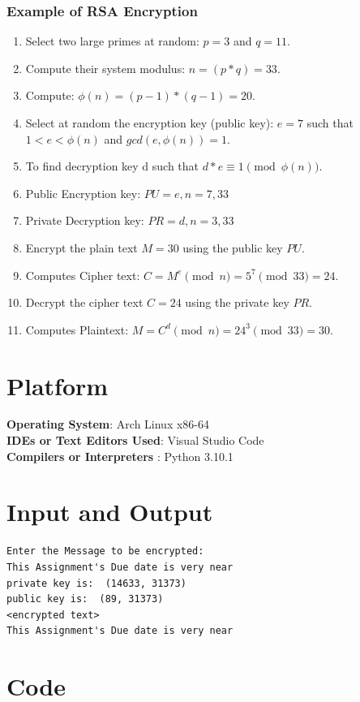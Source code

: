 \documentclass[openany]{book}
\begin{document}
\subsubsection{Example of RSA Encryption}
\begin{enumerate}
	\item Select two large primes at random: $p = 3$ and $q = 11$.
	\item Compute their system modulus: $n = (p*q) = 33$.
	\item Compute: $\phi(n) = (p-1)*(q-1) = 20$.
	\item Select at random the encryption key (public key): $e = 7$ such that $1 < e < \phi(n)$ and $gcd(e, \phi(n)) = 1$.
	\item To find decryption key d such that $d*e \equiv 1 \pmod{\phi(n)}$.
	\item Public Encryption key: $PU = {e, n} = {7, 33}$
	\item Private Decryption key: $PR = {d, n} = {3, 33}$
	\item Encrypt the plain text $M = 30$ using the public key $PU$.
	\item Computes Cipher text: $C = M^e \pmod{n} = 5^7 \pmod{33} = 24$.
	\item Decrypt the cipher text $C = 24$ using the private key $PR$.
	\item Computes Plaintext: $M = C^d \pmod{n} = 24^3 \pmod{33} = 30$.
\end{enumerate}

\section{Platform}
\textbf{Operating System}: Arch Linux x86-64 \\
\textbf{IDEs or Text Editors Used}: Visual Studio Code\\
\textbf{Compilers or Interpreters} : Python 3.10.1\\

\section{Input and Output}
\begin{verbatim}
Enter the Message to be encrypted: 
This Assignment's Due date is very near
private key is:  (14633, 31373)
public key is:  (89, 31373)
<encrypted text>
This Assignment's Due date is very near
\end{verbatim}
\section{Code}

\end{document}
